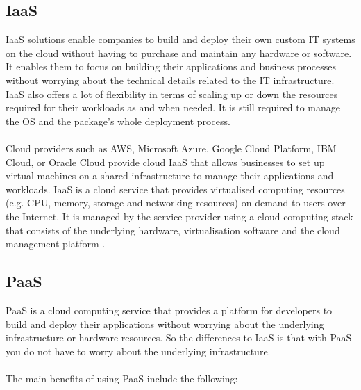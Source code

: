 \documentclass[BIF,Bachelor,nenglish]{twbook}%
\begin{document}
\subsection{\ac{IaaS}}
\ac{IaaS} solutions enable companies to build and deploy their own custom IT systems on the cloud without having to purchase and maintain any hardware or software. It enables them to focus on building their applications and business processes without worrying about the technical details related to the IT infrastructure. \ac{IaaS} also offers a lot of flexibility in terms of scaling up or down the resources required for their workloads as and when needed. It is still required to manage the OS and the package's whole deployment process.
\\
\\
Cloud providers such as AWS, Microsoft Azure, Google Cloud Platform, IBM Cloud, or Oracle Cloud provide cloud \ac{IaaS} that allows businesses to set up virtual machines on a shared infrastructure to manage their applications and workloads. \ac{IaaS} is a cloud service that provides virtualised computing resources (e.g. CPU, memory, storage and networking resources) on demand to users over the Internet. It is managed by the service provider using a cloud computing stack that consists of the underlying hardware, virtualisation software and the cloud management platform \cite{buy2019} .


\subsection{\ac{PaaS}}
\ac{PaaS} is a cloud computing service that provides a platform for developers to build and deploy their applications without worrying about the underlying infrastructure or hardware resources. So the differences to \ac{IaaS} is that with \ac{PaaS} you do not have to worry about the underlying infrastructure.
\\
\\
The main benefits of using \ac{PaaS} include the following:
\end{document}
